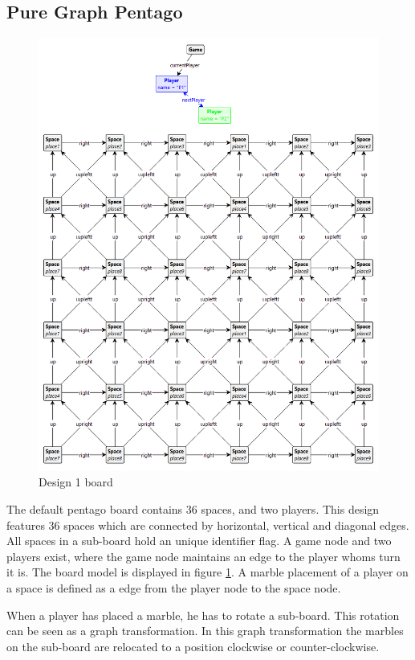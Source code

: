 \subsection{Pure Graph Pentago}

\begin{figure}[!h]
    \centering
    \includegraphics[scale=0.25,clip]{Images/board1.png}
    \caption{Design 1 board}
    \label{fig:board1}
\end{figure}

The default pentago board contains 36 spaces, and two players.
This design features 36 spaces which are connected by horizontal, vertical and diagonal edges.
All spaces in a sub-board hold an unique identifier flag.
A game node and two players exist, where the game node maintains an edge to the player whoms turn it is.
The board model is displayed in figure \ref{fig:board1}.
A marble placement of a player on a space is defined as a edge from the player node to the space node.

When a player has placed a marble, he has to rotate a sub-board.
This rotation can be seen as a graph transformation.
In this graph transformation the marbles on the sub-board are relocated to a position clockwise or counter-clockwise.

